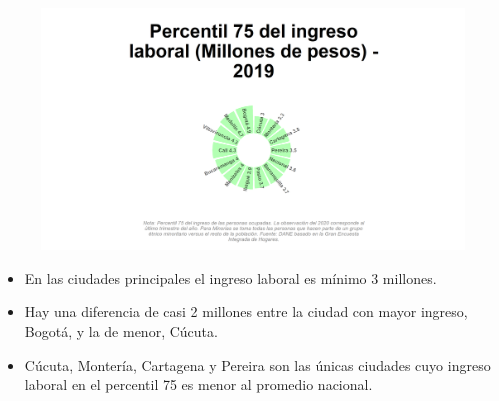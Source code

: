     \begin{figure}[H]
        \caption[Percentil 75 del ingreso laboral por ciudades principales para 2019]{\label{ingreso_laboral_75_ciudades} }
        \begin{center}
        \includegraphics[width=\textwidth,keepaspectratio]{img/var_26455_static.png}
        \end{center}
    \end{figure}
            \begin{itemize}
                    \item En las ciudades principales el ingreso laboral es mínimo 3 millones.
                    \item Hay una diferencia de casi 2 millones entre la ciudad con mayor ingreso, Bogotá, y la de menor, Cúcuta.
                    \item Cúcuta, Montería, Cartagena y Pereira son las únicas ciudades cuyo ingreso laboral en el percentil 75 es menor al promedio nacional.
                \end{itemize}

